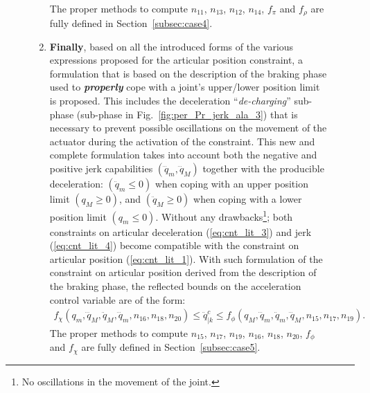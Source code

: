 \begin{figure}[!htbp]
\begin{enumerate}
\begin{equation}
\begin{split}
\label{eq:qddot_cond_to_satisfy_Acc_Jerk_posi_compatibility}
\end{split}
\end{equation}
The proper methods to compute $n_{11}$, $n_{13}$, $n_{12}$, $n_{14}$, $f_{\pi}$ and $f_{\rho}$ are fully defined in Section~\ref{subsec:case4}. 
\item \textbf{Finally}, based on all the introduced forms of the various expressions proposed for the articular position constraint, a formulation that is based on the  description of the braking phase used to \textit{\textbf{properly}} cope with a joint's upper/lower position limit is proposed. This includes the deceleration ``\textit{de-charging}'' sub-phase (sub-phase  in Fig.~\ref{fig:per_Pr_jerk_ala_3}) that is necessary to prevent possible oscillations on the movement of the actuator during the activation of the constraint. This new and complete formulation takes into account both the negative and positive jerk capabilities $(\dddot{q}_m, \dddot{q}_M)$ together with the producible deceleration: $(\ddot{q}_m \leq 0)$ when coping with an upper position limit $(q_M \geq 0)$, and $(\ddot{q}_M \geq 0)$ when coping with a lower position limit $(q_m \leq 0)$. Without any drawbacks\footnote{No oscillations in the movement of the joint.}; both constraints on articular deceleration (\ref{eq:cnt_lit_3}) and jerk (\ref{eq:cnt_lit_4}) become compatible with the constraint on articular position (\ref{eq:cnt_lit_1}). With such formulation of the constraint on articular position derived from the  description of the braking phase, the reflected bounds on the acceleration control variable are of the form: 
\begin{equation}
\begin{split}
f_{\chi}(q_m, \dddot{q}_M, \ddot{q}_M, \dddot{q}_m, n_{16}, n_{18}, n_{20}) \leq \ddot{q}_{|k}^{c} \leq f_{\phi}(q_M, \dddot{q}_m, \ddot{q}_m, \dddot{q}_M, n_{15}, n_{17}, n_{19}). 
\label{eq:qddot_cond_to_satisfy_Acc_Jerk_posi_compatibility2}
\end{split}
\end{equation}
The proper methods to compute $n_{15}$, $n_{17}$, $n_{19}$, $n_{16}$, $n_{18}$, $n_{20}$, $f_{\phi}$ and $f_{\chi}$ are fully defined in Section~\ref{subsec:case5}.
\end{enumerate}

\end{figure}

